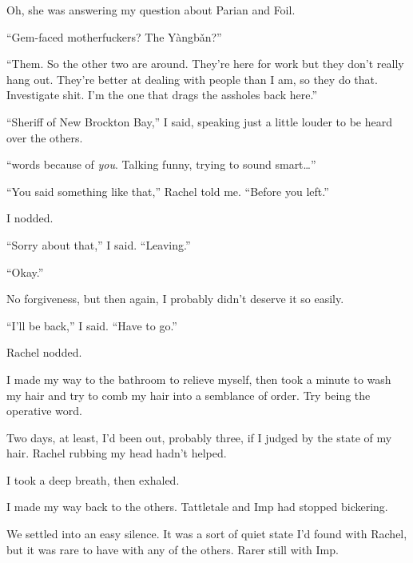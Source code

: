 Oh, she was answering my question about Parian and Foil.



``Gem-faced motherfuckers?  The Y\`{a}ngb\v{a}n?''



``Them.  So the other two are around.  They're here for work but they don't really hang out.  They're better at dealing with people than I am, so they do that.  Investigate shit.  I'm the one that drags the assholes back here.''



``Sheriff of New Brockton Bay,'' I said, speaking just a little louder to be heard over the others.



``\ldotsfucking words because of \emph{you}.  Talking funny, trying to sound smart\ldots''



``You said something like that,'' Rachel told me.  ``Before you left.''



I nodded.



``Sorry about that,'' I said.  ``Leaving.''



``Okay.''



No forgiveness, but then again, I probably didn't deserve it so easily.



``I'll be back,'' I said.  ``Have to go.''



Rachel nodded.



I made my way to the bathroom to relieve myself, then took a minute to wash my hair and try to comb my hair into a semblance of order.  Try being the operative word.



Two days, at least, I'd been out, probably three, if I judged by the state of my hair.  Rachel rubbing my head hadn't helped.



I took a deep breath, then exhaled.



I made my way back to the others.  Tattletale and Imp had stopped bickering.



We settled into an easy silence.  It was a sort of quiet state I'd found with Rachel, but it was rare to have with any of the others.  Rarer still with Imp.



